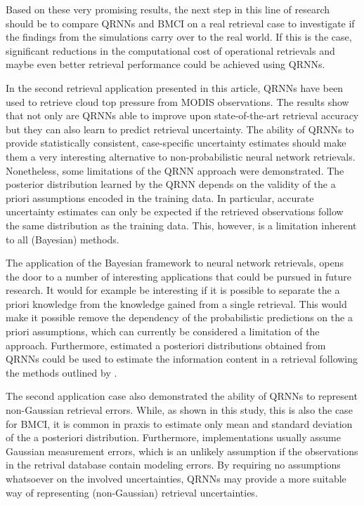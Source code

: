 \documentclass[journal abbreviation, manuscript]{copernicus}
\begin{document}
Based on these very promising results, the next step in this line of research
should be to compare QRNNs and BMCI on a real retrieval case to investigate if
the findings from the simulations carry over to the real world. If this is the
case, significant reductions in the computational cost of operational retrievals
and maybe even better retrieval performance could be achieved using QRNNs.

In the second retrieval application presented in this article, QRNNs have been
used to retrieve cloud top pressure from MODIS observations. The results show
that not only are QRNNs able to improve upon state-of-the-art retrieval accuracy
but they can also learn to predict retrieval uncertainty. The ability of
QRNNs to provide statistically consistent, case-specific uncertainty estimates
should make them a very interesting alternative to non-probabilistic neural
network retrievals. Nonetheless, some limitations of the QRNN approach were
demonstrated. The posterior distribution learned by the QRNN depends on the
validity of the a priori assumptions encoded in the training data. In
particular, accurate uncertainty estimates can only be expected if the retrieved
observations follow the same distribution as the training data. This, however,
is a limitation inherent to all (Bayesian) methods.

The application of the Bayesian framework to neural network retrievals, opens
the door to a number of interesting applications that could be pursued in future
research. It would for example be interesting if it is possible to separate the
a priori knowledge from the knowledge gained from a single retrieval. This would
make it possible remove the dependency of the probabilistic predictions on the a
priori assumptions, which can currently be considered a limitation of the
approach. Furthermore, estimated a posteriori distributions obtained from QRNNs
could be used to estimate the information content in a retrieval following the
methods outlined by \citet{rodgers}.

The second application case also demonstrated the ability of QRNNs to represent
non-Gaussian retrieval errors. While, as shown in this study, this is also the case
for BMCI, it is common in praxis to estimate only mean and standard
deviation of the a posteriori distribution. Furthermore, implementations usually
assume Gaussian measurement errors, which is an unlikely assumption if the
observations in the retrival database contain modeling errors. By requiring no
assumptions whatsoever on the involved uncertainties, QRNNs may provide a more
suitable way of representing (non-Gaussian) retrieval uncertainties.
\end{document}
